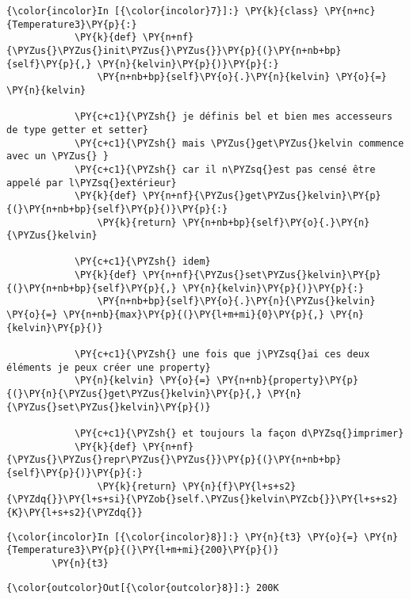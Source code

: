     \begin{Verbatim}[commandchars=\\\{\},frame=single,framerule=0.3mm,rulecolor=\color{cellframecolor}]
{\color{incolor}In [{\color{incolor}7}]:} \PY{k}{class} \PY{n+nc}{Temperature3}\PY{p}{:}
            \PY{k}{def} \PY{n+nf}{\PYZus{}\PYZus{}init\PYZus{}\PYZus{}}\PY{p}{(}\PY{n+nb+bp}{self}\PY{p}{,} \PY{n}{kelvin}\PY{p}{)}\PY{p}{:}
                \PY{n+nb+bp}{self}\PY{o}{.}\PY{n}{kelvin} \PY{o}{=} \PY{n}{kelvin}
        
            \PY{c+c1}{\PYZsh{} je définis bel et bien mes accesseurs de type getter et setter}
            \PY{c+c1}{\PYZsh{} mais \PYZus{}get\PYZus{}kelvin commence avec un \PYZus{} }
            \PY{c+c1}{\PYZsh{} car il n\PYZsq{}est pas censé être appelé par l\PYZsq{}extérieur}
            \PY{k}{def} \PY{n+nf}{\PYZus{}get\PYZus{}kelvin}\PY{p}{(}\PY{n+nb+bp}{self}\PY{p}{)}\PY{p}{:}
                \PY{k}{return} \PY{n+nb+bp}{self}\PY{o}{.}\PY{n}{\PYZus{}kelvin}
        
            \PY{c+c1}{\PYZsh{} idem}
            \PY{k}{def} \PY{n+nf}{\PYZus{}set\PYZus{}kelvin}\PY{p}{(}\PY{n+nb+bp}{self}\PY{p}{,} \PY{n}{kelvin}\PY{p}{)}\PY{p}{:}
                \PY{n+nb+bp}{self}\PY{o}{.}\PY{n}{\PYZus{}kelvin} \PY{o}{=} \PY{n+nb}{max}\PY{p}{(}\PY{l+m+mi}{0}\PY{p}{,} \PY{n}{kelvin}\PY{p}{)}
                
            \PY{c+c1}{\PYZsh{} une fois que j\PYZsq{}ai ces deux éléments je peux créer une property}
            \PY{n}{kelvin} \PY{o}{=} \PY{n+nb}{property}\PY{p}{(}\PY{n}{\PYZus{}get\PYZus{}kelvin}\PY{p}{,} \PY{n}{\PYZus{}set\PYZus{}kelvin}\PY{p}{)}
            
            \PY{c+c1}{\PYZsh{} et toujours la façon d\PYZsq{}imprimer}
            \PY{k}{def} \PY{n+nf}{\PYZus{}\PYZus{}repr\PYZus{}\PYZus{}}\PY{p}{(}\PY{n+nb+bp}{self}\PY{p}{)}\PY{p}{:}
                \PY{k}{return} \PY{n}{f}\PY{l+s+s2}{\PYZdq{}}\PY{l+s+si}{\PYZob{}self.\PYZus{}kelvin\PYZcb{}}\PY{l+s+s2}{K}\PY{l+s+s2}{\PYZdq{}}
\end{Verbatim}


    \begin{Verbatim}[commandchars=\\\{\},frame=single,framerule=0.3mm,rulecolor=\color{cellframecolor}]
{\color{incolor}In [{\color{incolor}8}]:} \PY{n}{t3} \PY{o}{=} \PY{n}{Temperature3}\PY{p}{(}\PY{l+m+mi}{200}\PY{p}{)}
        \PY{n}{t3}
\end{Verbatim}


\begin{Verbatim}[commandchars=\\\{\},frame=single,framerule=0.3mm,rulecolor=\color{cellframecolor}]
{\color{outcolor}Out[{\color{outcolor}8}]:} 200K
\end{Verbatim}
            
